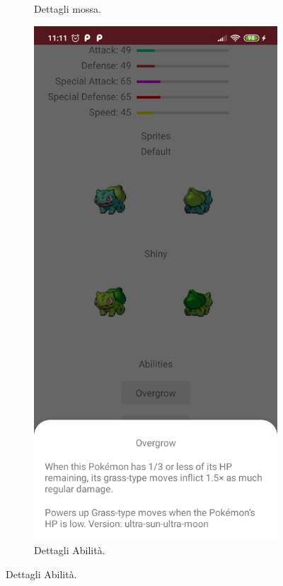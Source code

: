 \documentclass[a4paper,11pt]{article}
\begin{document}
\begin{figure}[h!]
{\begin{subfigure}[b]{0.3\linewidth}
    \caption{Dettagli mossa.}
  \end{subfigure}
    \begin{subfigure}[b]{0.3\linewidth}
    \includegraphics[width=\linewidth]{ability.jpg}
    \caption{Dettagli Abilità.}
  \end{subfigure}}
\end{figure}
\newpage
\end{document}
